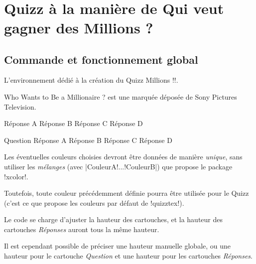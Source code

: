 \documentclass[french,a4paper,11pt]{article}
\begin{document}
\vfill~

\pagebreak

\section{Quizz à la manière de \og Qui veut gagner des Millions ? \fg}

\subsection{Commande et fonctionnement global}

\begin{cautionblock}
L'environnement dédié à la création du Quizz \og Millions \fg{} \motcletex!\QuizzMillions!.

\smallskip

\textsf{Who Wants to Be a Millionaire ?\texttrademark} est une marquée déposée de Sony Pictures Television.
\end{cautionblock}

\begin{DemoCode}
	{Réponse A}
	{Réponse B}
	{Réponse C}
	{Réponse D}
\end{DemoCode}

\begin{DemoCode}
\QuizzMillions
	{Question}
	{Réponse A}
	{Réponse B}
	{Réponse C}
	{Réponse D}
\end{DemoCode}

\begin{tipblock}
Les éventuelles couleurs choisies devront être données de manière \textit{unique}, sans utiliser les \textit{mélanges} (avec \motcletex|CouleurA!...!CouleurB|) que propose le package \packagetex!xcolor!.

Toutefois, toute couleur précédemment définie pourra être utilisée pour le Quizz (c'est ce que propose les couleurs par défaut de \packagetex!quizztex!).
\end{tipblock}

\begin{importantblock}
Le code se charge d'ajuster la hauteur des cartouches, et la hauteur des cartouches \textit{Réponses} auront tous la même hauteur.

\smallskip

Il est cependant possible de préciser une hauteur manuelle globale, ou une hauteur pour le cartouche \textit{Question} et une hauteur pour les cartouches \textit{Réponses}.
\end{importantblock}
\end{document}
